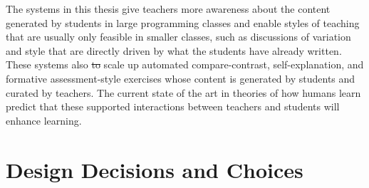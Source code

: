 \documentclass[12pt,twoside]{mitthesis}
\providecommand{\DIFdeltex}[1]{{\protect\color{red}\sout{#1}}}                      %
\providecommand{\DIFdelbegin}{} %
\providecommand{\DIFdelend}{} %
\providecommand{\DIFdel}[1]{\texorpdfstring{\DIFdeltex{#1}}{}} %
\begin{document}
The systems in this thesis give teachers more awareness about the content generated by students in large programming classes and enable styles of teaching that are usually only feasible in smaller classes, such as discussions of variation and style that are directly driven by what the students have already written. These systems also \DIFdelbegin \DIFdel{to }\DIFdelend scale up automated compare-contrast, self-explanation, and formative assessment-style exercises whose content is generated by students and curated by teachers. \DIFdelbegin %
\DIFdelend The current state of the art in theories of how humans learn predict that these supported interactions between teachers and students will enhance learning.

\DIFdelbegin %



\DIFdelend \section{Design Decisions and Choices}
\end{document}
